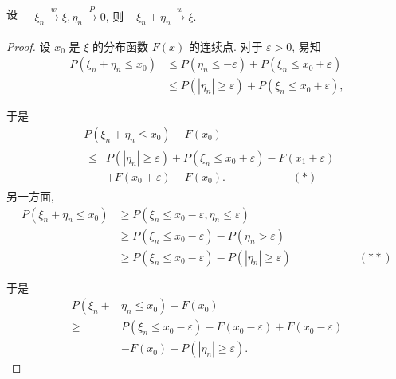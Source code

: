 \begin{theorem}
    设 $\begin{aligned} & \xi_n \stackrel{w}{\longrightarrow} \xi, \eta_n \stackrel{P}{\longrightarrow} 0 \text {, 则 }  & \xi_n+\eta_n \stackrel{w}{\longrightarrow} \xi .\end{aligned}$
\end{theorem}
{\small{
\begin{proof}
    设 $x_0$ 是 $\xi$ 的分布函数 $F(x)$ 的连续点. 对于 $\varepsilon>0$, 易知
$$
\begin{aligned}
P\left(\xi_n+\eta_n \leqslant x_0\right) & \leqslant P\left(\eta_n \leqslant-\varepsilon\right)+P\left(\xi_n \leqslant x_0+\varepsilon\right) \\
& \leqslant P\left(\left|\eta_n\right| \geqslant \varepsilon\right)+P\left(\xi_n \leqslant x_0+\varepsilon\right),
\end{aligned}
$$

于是
$$
\begin{aligned}
&P\left(\xi_n+\eta_n \leqslant x_0\right)-F\left(x_0\right)\\
&\begin{aligned}
\leqslant & P\left(\left|\eta_n\right| \geqslant \varepsilon\right)+P\left(\xi_n \leqslant x_0+\varepsilon\right)-F\left(x_1+\varepsilon\right) \\
& +F\left(x_0+\varepsilon\right)-F\left(x_0\right) . \qquad\qquad\qquad (*)
\end{aligned}
\end{aligned}
$$
另一方面,
$$
\begin{aligned}
P\left(\xi_n+\eta_n \leqslant x_0\right) & \geqslant P\left(\xi_n \leqslant x_0-\varepsilon, \eta_n \leqslant \varepsilon\right) \\
& \geqslant P\left(\xi_n \leqslant x_0-\varepsilon\right)-P\left(\eta_n>\varepsilon\right) \\
& \geqslant P\left(\xi_n \leqslant x_0-\varepsilon\right)-P\left(\left|\eta_n\right| \geqslant \varepsilon\right)\qquad\qquad\qquad (**)
\end{aligned}
$$

于是
$$
\begin{aligned}
P\left(\xi_n+\right. & \left.\eta_n \leqslant x_0\right)-F\left(x_0\right) \\
\geqslant & P\left(\xi_n \leqslant x_0-\varepsilon\right)-F\left(x_0-\varepsilon\right)+F\left(x_0-\varepsilon\right) \\
& -F\left(x_0\right)-P\left(\left|\eta_n\right| \geqslant \varepsilon\right) .
\end{aligned}
$$


\end{proof}}}
